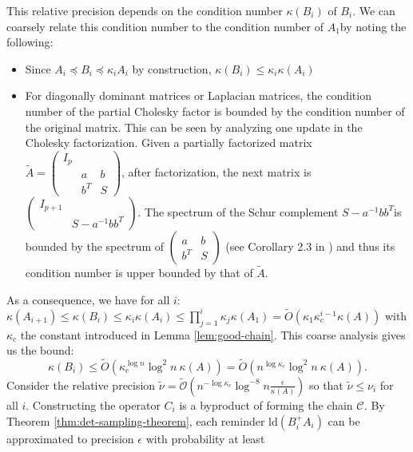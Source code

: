 This relative precision depends on the condition number $\kappa\left(B_{i}\right)$
of $B_{i}$. We can coarsely relate this condition number to the condition
number of $A_{1}$by noting the following:
\begin{itemize}
\item Since $A_{i}\preceq B_{i}\preceq\kappa_{i}A_{i}$ by construction,
$\kappa\left(B_{i}\right)\leq\kappa_{i}\kappa\left(A_{i}\right)$
\item For diagonally dominant matrices or Laplacian matrices, the condition
number of the partial Cholesky factor is bounded by the condition
number of the original matrix. This can be seen by analyzing one update
in the Cholesky factorization. Given a partially factorized matrix
$\tilde{A}=\left(\begin{array}{ccc}
I_{p}\\
 & a & b\\
 & b^{T} & S
\end{array}\right)$, after factorization, the next matrix is $\left(\begin{array}{cc}
I_{p+1}\\
 & S-a^{-1}bb^{T}
\end{array}\right)$. The spectrum of the Schur complement $S-a^{-1}bb^{T}$is bounded
by the spectrum of $\left(\begin{array}{cc}
a & b\\
b^{T} & S
\end{array}\right)$ (see Corollary 2.3 in \cite{Zhang2005}) and thus its condition number
is upper bounded by that of $\tilde{A}$.
\end{itemize}
As a consequence, we have for all $i$: $\kappa\left(A_{i+1}\right)\leq\kappa\left(B_{i}\right)\leq\kappa_{i}\kappa\left(A_{i}\right)\leq\prod_{j=1}^{i}\kappa_{j}\kappa\left(A_{1}\right) =\tilde{O} \left(\kappa_1\kappa_{c}^{i-1}\kappa\left(A\right)\right)$ with $\kappa_c$ the constant introduced in Lemma \ref{lem:good-chain}. This coarse analysis gives us the bound:
\[
\kappa\left(B_{i}\right)\leq\tilde{O}\left(\kappa_{c}^{\log n}\log^{2}n ~ \kappa\left(A\right)\right)=\tilde{O}\left(n^{\log\kappa_{c}}\log^{2}n \ \kappa\left(A\right)\right).
\] Consider the relative precision
$\tilde{\nu}=\tilde{\mathcal{O}}\left(n^{-\log\kappa_{c}}\log^{-8}n\frac{\epsilon}{\kappa\left(A\right)}\right)$
so that $\tilde{\nu}\leq\nu_{i}$ for all $i$. Constructing the operator
$C_{i}$ is a byproduct of forming the chain \emph{$\mathcal{C}$.
}By Theorem \ref{thm:det-sampling-theorem}, each reminder $\text{ld}\left(B_{i}^{+}A_{i}\right)$
can be approximated to precision $\epsilon$ with probability at least
